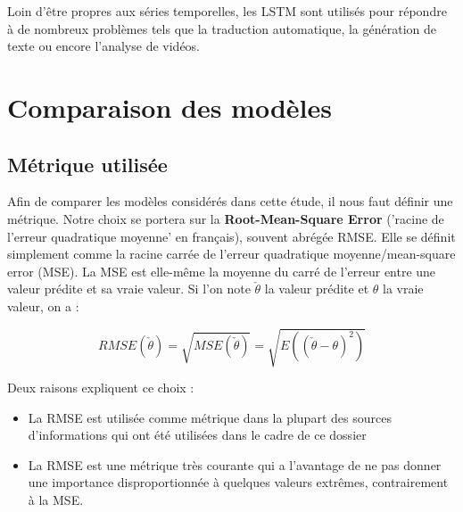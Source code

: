 \documentclass[french]{article}
\begin{document}
    Loin d'être propres aux séries temporelles, les LSTM sont utilisés pour répondre à de nombreux problèmes tels que la traduction automatique, la génération de texte ou encore l'analyse de vidéos.

    \section{Comparaison des modèles}

    \subsection{Métrique utilisée}
    
    Afin de comparer les modèles considérés dans cette étude, il nous faut définir une métrique. Notre choix se portera sur la \textbf{Root-Mean-Square Error} ('racine de l'erreur quadratique moyenne' en français), souvent abrégée RMSE. Elle se définit simplement comme la racine carrée de l'erreur quadratique moyenne/mean-square error (MSE). La MSE est elle-même la moyenne du carré de l'erreur entre une valeur prédite et sa vraie valeur. Si l'on note $\check{\theta}$ la valeur prédite et $\theta$ la vraie valeur, on a :
    
    \begin{equation}RMSE(\check{\theta}) =  \sqrt{MSE(\check{\theta})} = \sqrt{E((\check{\theta} - \theta)^2)}\end{equation}

    Deux raisons expliquent ce choix :
    \begin{itemize}
        \item La RMSE est utilisée comme métrique dans la plupart des sources d'informations qui ont été utilisées dans le cadre de ce dossier
        \item La RMSE est une métrique très courante qui a l'avantage de ne pas donner une importance disproportionnée à quelques valeurs extrêmes, contrairement à la MSE.
    \end{itemize}
\end{document}
